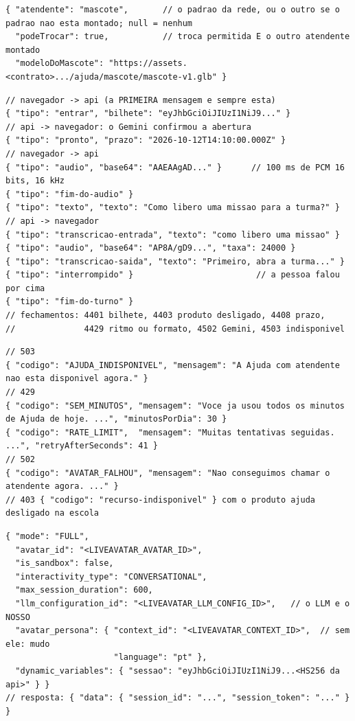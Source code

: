 \begin{lstlisting}[language=jsonunoo, caption={\rota{GET /ajuda/configuracao} --- 200}]
{ "atendente": "mascote",       // o padrao da rede, ou o outro se o padrao nao esta montado; null = nenhum
  "podeTrocar": true,           // troca permitida E o outro atendente montado
  "modeloDoMascote": "https://assets.<contrato>.../ajuda/mascote/mascote-v1.glb" }
\end{lstlisting}

\begin{lstlisting}[language=jsonunoo, caption={\rota{WS /ajuda/mascote/ao-vivo} --- uma conversa (\adrr{ADR-158})}]
// navegador -> api (a PRIMEIRA mensagem e sempre esta)
{ "tipo": "entrar", "bilhete": "eyJhbGciOiJIUzI1NiJ9..." }
// api -> navegador: o Gemini confirmou a abertura
{ "tipo": "pronto", "prazo": "2026-10-12T14:10:00.000Z" }
// navegador -> api
{ "tipo": "audio", "base64": "AAEAAgAD..." }      // 100 ms de PCM 16 bits, 16 kHz
{ "tipo": "fim-do-audio" }
{ "tipo": "texto", "texto": "Como libero uma missao para a turma?" }
// api -> navegador
{ "tipo": "transcricao-entrada", "texto": "como libero uma missao" }
{ "tipo": "audio", "base64": "AP8A/gD9...", "taxa": 24000 }
{ "tipo": "transcricao-saida", "texto": "Primeiro, abra a turma..." }
{ "tipo": "interrompido" }                         // a pessoa falou por cima
{ "tipo": "fim-do-turno" }
// fechamentos: 4401 bilhete, 4403 produto desligado, 4408 prazo,
//              4429 ritmo ou formato, 4502 Gemini, 4503 indisponivel
\end{lstlisting}

\begin{lstlisting}[language=jsonunoo, caption={As recusas de \rota{POST /ajuda/sessoes}, que o hub mostra como vieram}]
// 503
{ "codigo": "AJUDA_INDISPONIVEL", "mensagem": "A Ajuda com atendente nao esta disponivel agora." }
// 429
{ "codigo": "SEM_MINUTOS", "mensagem": "Voce ja usou todos os minutos de Ajuda de hoje. ...", "minutosPorDia": 30 }
{ "codigo": "RATE_LIMIT",  "mensagem": "Muitas tentativas seguidas. ...", "retryAfterSeconds": 41 }
// 502
{ "codigo": "AVATAR_FALHOU", "mensagem": "Nao conseguimos chamar o atendente agora. ..." }
// 403 { "codigo": "recurso-indisponivel" } com o produto ajuda desligado na escola
\end{lstlisting}

\begin{lstlisting}[language=jsonunoo, caption={A api \seta{} o \emph{vendor}: \rota{POST /v1/sessions/token} (cabeçalho \cd{x-api-key})}]
{ "mode": "FULL",
  "avatar_id": "<LIVEAVATAR_AVATAR_ID>",
  "is_sandbox": false,
  "interactivity_type": "CONVERSATIONAL",
  "max_session_duration": 600,
  "llm_configuration_id": "<LIVEAVATAR_LLM_CONFIG_ID>",   // o LLM e o NOSSO
  "avatar_persona": { "context_id": "<LIVEAVATAR_CONTEXT_ID>",  // sem ele: mudo
                      "language": "pt" },
  "dynamic_variables": { "sessao": "eyJhbGciOiJIUzI1NiJ9...<HS256 da api>" } }
// resposta: { "data": { "session_id": "...", "session_token": "..." } }
\end{lstlisting}

